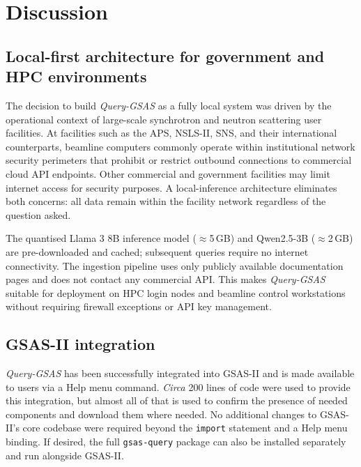 \section{Discussion}
\label{sec:discussion}

\subsection{Local-first architecture for government and HPC environments}

The decision to build \textit{Query-GSAS} as a fully local system was driven
by the operational context of large-scale synchrotron and neutron
scattering user facilities.
At facilities such as the APS, NSLS-II, SNS, and their international
counterparts, beamline computers commonly operate within institutional
network security perimeters that prohibit or restrict outbound
connections to commercial cloud API endpoints. Other commercial and government facilities may limit internet access for security purposes. 
A local-inference architecture eliminates both concerns: all data
remain within the facility network regardless of the question asked.

The quantised Llama 3 8B inference model ($\approx$5\,GB) and
Qwen2.5-3B ($\approx$2\,GB) are pre-downloaded and cached;
subsequent queries require no internet connectivity.
The ingestion pipeline uses only publicly available documentation
pages and does not contact any commercial API.
This makes \textit{Query-GSAS} suitable for deployment on HPC login nodes
and beamline control workstations without requiring firewall
exceptions or API key management.

\subsection{GSAS-II integration}

\textit{Query-GSAS} has been successfully integrated into GSAS-II and is made available to users via a Help menu command. \textit{Circa} 200 lines of code were used to provide this integration, but almost all of that is used to confirm the presence of needed components and download them where needed. No additional changes to GSAS-II's core codebase were required
beyond the \texttt{import} statement and a Help menu binding. If desired, the full 
\texttt{gsas-query} package can also be installed separately and run alongside GSAS-II. 

